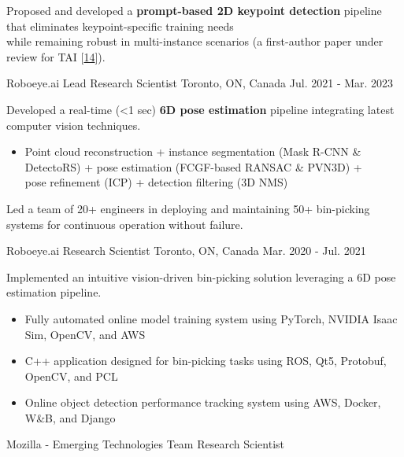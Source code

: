 \begin{cventries}
{\begin{cvitems}
\item {Proposed and developed a \textbf{prompt-based 2D keypoint detection} pipeline that eliminates keypoint-specific training needs \\while remaining robust in multi-instance scenarios (a first-author paper under review for TAI [\hyperlink{LAM:TAI}{14}]).}
\end{cvitems}
}
\cventry
{Roboeye.ai} %
{Lead Research Scientist} %
{Toronto, ON, Canada} %
{Jul. 2021 - Mar. 2023} %
{ %
\begin{cvitems}
\item {Developed a real-time (<1 sec) \textbf{6D pose estimation} pipeline integrating latest computer vision techniques.}
\begin{itemize}[label=$\cdot$,leftmargin=0.7em]
\item{Point cloud reconstruction + instance segmentation (Mask R-CNN \& DetectoRS) + pose estimation (FCGF-based RANSAC \& PVN3D) + \\
pose refinement (ICP) + detection filtering (3D NMS)}
\end{itemize}
\item {Led a team of 20+ engineers in deploying and maintaining 50+ bin-picking systems for continuous operation without failure.}
\end{cvitems}
}
\cventry
{Roboeye.ai} %
{Research Scientist} %
{Toronto, ON, Canada} %
{Mar. 2020 - Jul. 2021} %
{ %
\begin{cvitems}
\item {Implemented an intuitive vision-driven bin-picking solution leveraging a 6D pose estimation pipeline.}
\begin{itemize}[label=$\cdot$,leftmargin=0.7em]
\item {Fully automated online model training system using PyTorch, NVIDIA Isaac Sim, OpenCV, and AWS}
\item {C++ application designed for bin-picking tasks using ROS, Qt5, Protobuf, OpenCV, and PCL}
\item {Online object detection performance tracking system using AWS, Docker, W\&B, and Django}
\end{itemize}
\end{cvitems}
}
\cventry
{Mozilla - Emerging Technologies Team} %
{Research Scientist} %

\end{cventries}
